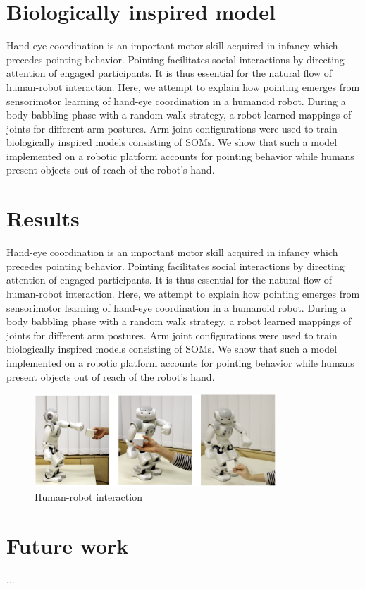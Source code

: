 \documentclass{sig-alternate-2013}
\begin{document}
\section{Biologically inspired model}
Hand-eye coordination is an important motor skill acquired in infancy which precedes pointing behavior. Pointing facilitates social interactions by directing attention of engaged participants. It is thus essential for the natural flow of human-robot interaction. Here, we attempt to explain how pointing emerges from sensorimotor learning of hand-eye coordination in a humanoid robot. During a body babbling phase with a random walk strategy, a robot learned mappings of joints for different arm postures. Arm joint configurations were used to train biologically inspired models consisting of SOMs. We show that such a model implemented on a robotic platform accounts for pointing behavior while humans present objects out of reach of the robot's hand.

\section{Results}
Hand-eye coordination is an important motor skill acquired in infancy which precedes pointing behavior. Pointing facilitates social interactions by directing attention of engaged participants. It is thus essential for the natural flow of human-robot interaction. Here, we attempt to explain how pointing emerges from sensorimotor learning of hand-eye coordination in a humanoid robot. During a body babbling phase with a random walk strategy, a robot learned mappings of joints for different arm postures. Arm joint configurations were used to train biologically inspired models consisting of SOMs. We show that such a model implemented on a robotic platform accounts for pointing behavior while humans present objects out of reach of the robot's hand.
\begin{figure}
\centering
\includegraphics[height=3.5cm]{experiment.eps}
\caption{Human-robot interaction}
\label{lab:experiment}
\end{figure}


\section{Future work}
...
\end{document}
